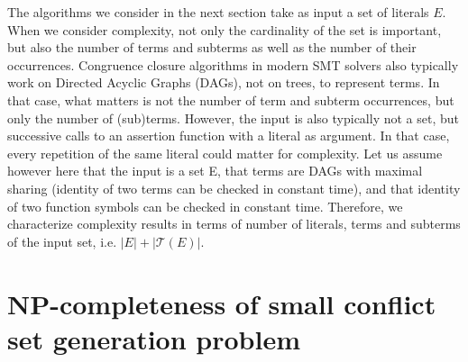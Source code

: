\documentclass{easychair}
\begin{document}

The algorithms we consider in the next section take as input a set of literals $E$.%
When we consider complexity, not only the cardinality of the set is important, but also the number of terms and subterms as well as the number of their occurrences. 
Congruence closure algorithms in modern SMT solvers also typically work on Directed Acyclic Graphs (DAGs), not on trees, to represent terms. In that case, what matters is not the number of term and subterm occurrences, but only the number of (sub)terms. However, the input is also typically not a set, but successive calls to an assertion function with a literal as argument. In that case, every repetition of the
same literal could matter for complexity. 
Let us assume however here that the input is a set E, that terms are DAGs with maximal sharing (identity of two terms can be checked in constant time), and that identity of two function symbols can be checked in constant time. 
Therefore, we characterize complexity results in terms of number of literals, terms and subterms of the input set, i.e. $|E| + |\mathcal{T}(E)|$.

\section*{NP-completeness of small conflict set generation problem}
\label{sec:npcomplete}


\end{document}
